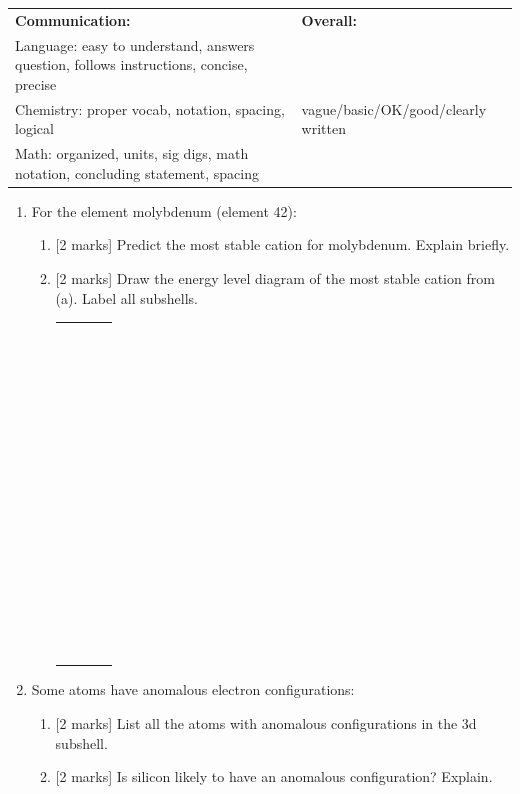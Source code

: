 \documentclass[11pt]{article}
\newcommand{\headerbox}{
    \noindent\begin{tabular}{|p{11cm}|p{5.5cm}|}
    \hline
    \scriptsize \textbf{Communication:} & \scriptsize \textbf{Overall:}\\
    \scriptsize Language: easy to understand, answers question, follows instructions, concise, precise & \\
    \scriptsize Chemistry: proper vocab, notation, spacing, logical & \scriptsize \space\space \space\space vague/basic/OK/good/clearly written \\
    \scriptsize Math: organized, units, sig digs, math notation, concluding statement, spacing & \\
    \hline
    \end{tabular}
    \vspace{1em}
}
\begin{document}
\pagebreak

\headerbox

\begin{enumerate}[leftmargin=*, label=\arabic*., start=5]
    \item For the element molybdenum (element 42):
    \begin{enumerate}[label=\textbf{\alph*.}]
        \item {[2 marks]} Predict the most stable cation for molybdenum. Explain briefly.
        \vspace{5em}
        \item {[2 marks]} Draw the energy level diagram of the most stable cation from (a). Label all subshells.
        \vspace{1.5em}
        \begin{center}
            \begin{tabular}{l l l l}
                \rule{1.5cm}{0.4pt} & & & \\
                & & & \\
                \rule{1.5cm}{0.4pt} & \rule{0.6cm}{0.4pt} \space \rule{0.6cm}{0.4pt} \space \rule{0.6cm}{0.4pt} & & \\
                & & & \\
                \rule{1.5cm}{0.4pt} & \rule{0.6cm}{0.4pt} \space \rule{0.6cm}{0.4pt} \space \rule{0.6cm}{0.4pt} & \rule{0.5cm}{0.4pt} \space \rule{0.5cm}{0.4pt} \space \rule{0.5cm}{0.4pt} \space \rule{0.5cm}{0.4pt} \space \rule{0.5cm}{0.4pt} & \\
                & & & \\
                \rule{1.5cm}{0.4pt} & \rule{0.6cm}{0.4pt} \space \rule{0.6cm}{0.4pt} \space \rule{0.6cm}{0.4pt} & \rule{0.5cm}{0.4pt} \space \rule{0.5cm}{0.4pt} \space \rule{0.5cm}{0.4pt} \space \rule{0.5cm}{0.4pt} \space \rule{0.5cm}{0.4pt} & \rule{0.5cm}{0.4pt} \space \rule{0.5cm}{0.4pt} \space \rule{0.5cm}{0.4pt} \space \rule{0.5cm}{0.4pt} \space \rule{0.5cm}{0.4pt} \\
                & & & \\
                \rule{1.5cm}{0.4pt} & & & \\
            \end{tabular}
        \end{center}
    \end{enumerate}
    \vspace{5em}

    \item Some atoms have anomalous electron configurations:
    \begin{enumerate}[label=\textbf{\alph*.}]
        \item {[2 marks]} List all the atoms with anomalous configurations in the 3d subshell.
        \vspace{4em}
        \item {[2 marks]} Is silicon likely to have an anomalous configuration? Explain.
        \vspace{6em}
    \end{enumerate}


\end{enumerate}
\end{document}
